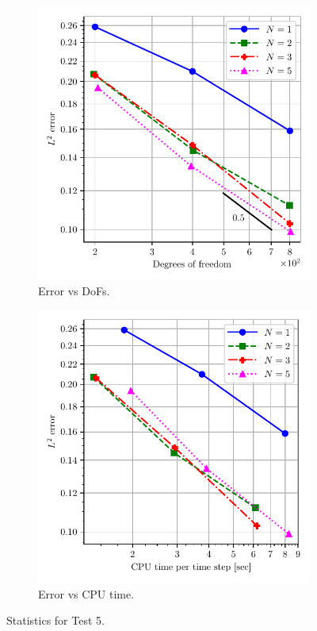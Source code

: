 \documentclass[a4paper,11pt,oneside]{article}
\begin{document}
\begin{figure}[htbp]
	\centering
	\begin{subfigure}{0.5\linewidth}
		\includegraphics[width=\linewidth]{figures/riemann_1d/test1-5/error_vs_dof_chandrashekhar.pdf}
		\caption{Error vs DoFs.}
		\label{subfig:test1-5_error_vs_dof_chandrashekhar}
	\end{subfigure}%
	\begin{subfigure}{0.5\linewidth}
		\includegraphics[width=\linewidth]{figures/riemann_1d/test1-5/error_vs_cputime_chandrashekhar.pdf}
		\caption{Error vs CPU time.}
		\label{subfig:test1-5_error_vs_cputime_chandrashekhar}
	\end{subfigure}
	\caption{Statistics for Test 5.}
	\label{fig:test1-5_error_plots_chandrashekhar}
\end{figure}

\printbibliography
\end{document}
